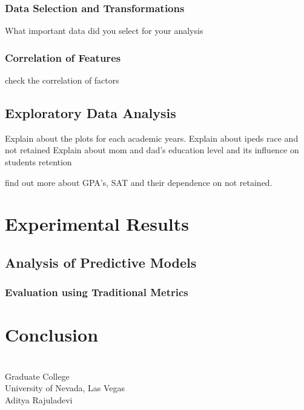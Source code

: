 \documentclass[11pt,openright]{report}
\begin{document}
\subsection {Data Selection and Transformations}
What important data did you select for your analysis
\subsection {Correlation of Features}
check the correlation of factors

\section{Exploratory Data Analysis}
Explain about the plots for each academic years.
Explain about ipeds race and not retained
Explain about mom and dad's education level and its influence on students retention

find out more about GPA's, SAT and their dependence on not retained.

\chapter{Experimental Results} \label{chapter:experiment_results}
\section {Analysis of Predictive Models}
\subsection {Evaluation using Traditional Metrics}
\chapter{Conclusion} \label{chapter:conclusion}



\vita
\chapter{} %
\linespread{1.3} 
\begin{center}
Graduate College\\
University of Nevada, Las Vegas\\[1cm]
Aditya Rajuladevi\\[1cm]
\end{center}
\end{document}
